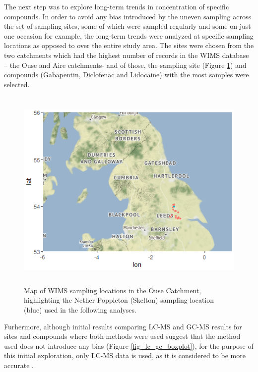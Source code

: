 \documentclass{article}
\begin{document}
The next step was to explore long-term trends in concentration of specific compounds. In order to avoid any bias introduced by the uneven sampling across the set of sampling sites, some of which were sampled regularly and some on just one occasion for example, the long-term trends were analyzed at specific sampling locations as opposed to over the entire study area. The sites were chosen from the two catchments which had the highest number of records in the WIMS database – the Ouse and Aire catchments- and of those, the sampling site (Figure \ref{fig_ouse_site_map}) and compounds (Gabapentin, Diclofenac and Lidocaine) with the most samples were selected. 

\begin{figure}[h]
    \centering
    \includegraphics[height=10cm]{fig_ouse_site_map.png}
    \caption{Map of WIMS sampling locations in the Ouse Catchment, highlighting the Nether Poppleton (Skelton) sampling location (blue) used in the following analyses.}
    \label{fig_ouse_site_map}
\end{figure}

Furhermore, although initial results comparing LC-MS and GC-MS results for sites and compounds where both methods were used suggest that the method used does not introduce any bias (Figure \ref{fig_lc_gc_boxplot}), for the purpose of this initial exploration, only LC-MS data is used, as it is considered to be more accurate \citep{Stout2009ABenzoylecgonine}.
\end{document}
